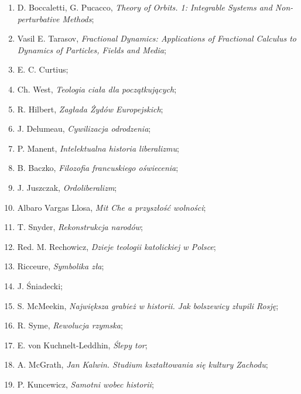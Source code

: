 \documentclass[a4paper,11pt]{article}
\begin{document}
\begin{enumerate}
\item D. Boccaletti, G. Pucacco, \textit{Theory of Orbits. 1: Integrable
    Systems and Non-perturbative Methods};

\item Vasil E. Tarasov, \textit{Fractional Dynamics: Applications of
    Fractional Calculus to Dynamics of Particles, Fields and Media};

\item E. C. Curtius;

\item Ch. West, \textit{Teologia ciała dla początkujących};

\item R. Hilbert, \textit{Zagłada Żydów Europejskich};

\item J. Delumeau, \textit{Cywilizacja odrodzenia};

\item P. Manent, \textit{Intelektualna historia liberalizmu};

\item B. Baczko, \textit{Filozofia francuskiego oświecenia};

\item J. Juszczak, \textit{Ordoliberalizm};

\item Albaro Vargas Llosa, \textit{Mit Che a przyszłość wolności};

\item T. Snyder, \textit{Rekonstrukcja narodów};

\item Red. M. Rechowicz, \textit{Dzieje teologii katolickiej w Polsce};

\item Ricceure, \textit{Symbolika zła};

\item J. Śniadecki;

\item S. McMeekin, \textit{Największa grabież w historii. Jak bolszewicy
    złupili Rosję};

\item R. Syme, \textit{Rewolucja rzymska};

\item E. von Kuchnelt-Leddhin, \textit{Ślepy tor};

\item A. McGrath, \textit{Jan Kalwin. Studium kształtowania się kultury
    Zachodu};

\item P. Kuncewicz, \textit{Samotni wobec historii};


\end{enumerate}
\end{document}
